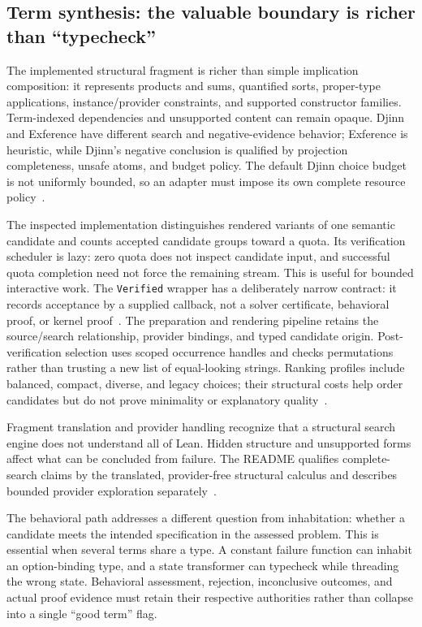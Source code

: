 \documentclass[11pt,letterpaper]{article}
\newcommand{\code}[1]{\nolinkurl{#1}}
\begin{document}
\subsection{Term synthesis: the valuable boundary is richer than ``typecheck''}
The implemented structural fragment is richer than simple implication composition:
it represents products and sums, quantified sorts, proper-type applications,
instance/provider constraints, and supported constructor families. Term-indexed
dependencies and unsupported content can remain opaque. Djinn and Exference have
different search and negative-evidence behavior; Exference is heuristic, while
Djinn's negative conclusion is qualified by projection completeness, unsafe atoms,
and budget policy. The default Djinn choice budget is not uniformly bounded, so
an adapter must impose its own complete resource policy~\cite{l-engine,l-fragment}.

The inspected implementation distinguishes rendered variants of one semantic
candidate and counts accepted candidate groups toward a quota. Its verification
scheduler is lazy: zero quota does not inspect candidate input, and successful
quota completion need not force the remaining stream. This is useful for bounded
interactive work. The \code{Verified} wrapper has a deliberately narrow contract:
it records acceptance by a supplied callback, not a solver certificate, behavioral
proof, or kernel proof~\cite{l-verification}.
The preparation and rendering pipeline retains the source/search relationship,
provider bindings, and typed candidate origin. Post-verification selection uses
scoped occurrence handles and checks permutations rather than trusting a new list
of equal-looking strings. Ranking profiles include balanced, compact, diverse,
and legacy choices; their structural costs help order candidates but do not prove
minimality or explanatory quality~\cite{l-engine,l-post,l-quality}.

Fragment translation and provider handling recognize that a structural search
engine does not understand all of Lean. Hidden structure and unsupported forms
affect what can be concluded from failure. The README qualifies complete-search
claims by the translated, provider-free structural calculus and describes
bounded provider exploration separately~\cite{l-fragment,l-readme}.

The behavioral path addresses a different question from inhabitation: whether
a candidate meets the intended specification in the assessed problem. This is
essential when several terms share a type. A constant failure function can inhabit
an option-binding type, and a state transformer can typecheck while threading the
wrong state. Behavioral assessment, rejection, inconclusive outcomes, and actual
proof evidence must retain their respective authorities rather than collapse into
a single ``good term'' flag.
\end{document}
